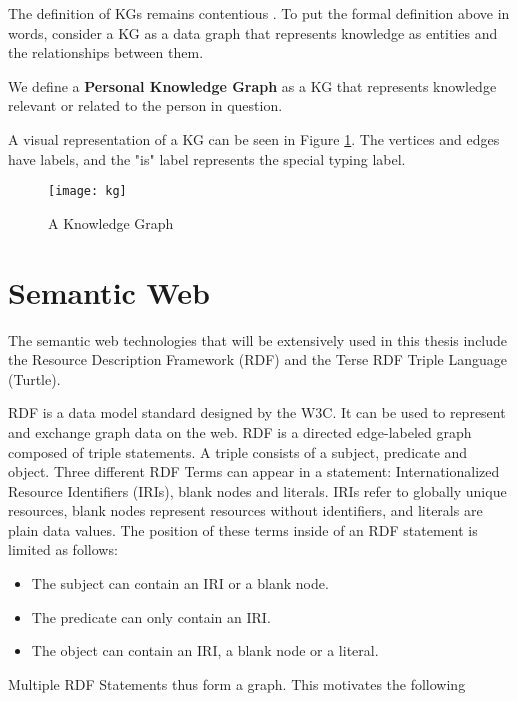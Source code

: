 The definition of KGs remains contentious \cite{Hogan2021KG,commonsenseKG}. To put the formal definition above in words, consider a KG as a data graph that represents knowledge as entities and the relationships between them. 

We define a \textbf{Personal Knowledge Graph} as a KG that represents knowledge relevant or related to the person in question.

A visual representation of a KG can be seen in Figure \ref{fig:kg}. The vertices and edges have labels, and the "is" label represents the special typing label.

\begin{figure}[H]
    \centering
    \texttt{[image: kg]}
    \caption[]{A Knowledge Graph}
    \label{fig:kg}
\end{figure}







\section{Semantic Web}

The semantic web technologies that will be extensively used in this thesis include the Resource Description Framework (RDF) and the Terse RDF Triple Language (Turtle).

RDF is a data model standard designed by the W3C. It can be used to represent and exchange graph data on the web. RDF is a directed edge-labeled graph composed of triple statements. A triple consists of a subject, predicate and object. Three different RDF Terms can appear in a statement: Internationalized Resource Identifiers (IRIs), blank nodes and literals. IRIs refer to globally unique resources, blank nodes represent resources without identifiers, and literals are plain data values. The position of these terms inside of an RDF statement is limited as follows:

\begin{itemize}
    \item The subject can contain an IRI or a blank node.
    \item The predicate can only contain an IRI.
    \item The object can contain an IRI, a blank node or a literal.
\end{itemize}

Multiple RDF Statements thus form a graph. This motivates the following

